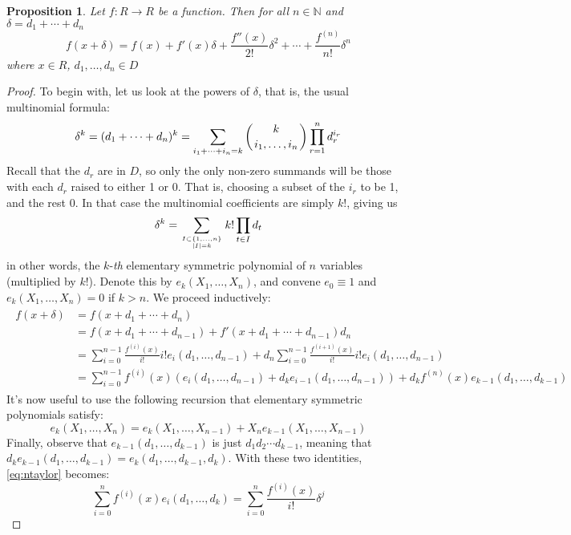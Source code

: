 \documentclass[11pt]{article}
\newtheorem{proposition}{Proposition}[section]
\theoremstyle{definition}
\newcommand{\abs}[1]{\lvert #1 \rvert} %
\numberwithin{equation}{section}
\begin{document}
\begin{proposition}
  Let \( f:R\to R \) be a function. Then for all \( n\in\mathbb N \) and \( \delta = d_1+\cdots+d_n \)
  \begin{equation*}
    f(x+\delta) = f(x) + f'(x)\delta + \frac{f''(x)}{2!}\delta^2 + \cdots + \frac{f^{(n)}}{n!}\delta^n
  \end{equation*}
  where \( x\in R \), \( d_1,\dots,d_n\in D \)
\end{proposition}

\begin{proof}
  To begin with, let us look at the powers of \( \delta \), that is, the usual multinomial formula:
  \begin{equation*}
    \delta^k = (d_1+\cdots+d_n)^k = \sum_{i_1+\cdots+i_n=k}\left( k\atop i_1,\dots,i_n \right)\prod_{r=1}^{n}d_r^{i_r}
  \end{equation*}
  Recall that the \( d_r \) are in \( D \), so only the only non-zero summands will be those with each \( d_r \) raised to either 1 or 0. That is, choosing a subset of the \( i_r \) to be 1, and the rest 0. In that case the multinomial coefficients are simply \( k! \), giving us
  \begin{equation*}
    \delta^k = \sum_{I\subset \{1,\dots,n\}\atop \abs{I}=k}k!\prod_{t\in I}d_t
  \end{equation*}
  in other words, the \( k \)-\textit{th} elementary symmetric polynomial of \( n \) variables (multiplied by \( k! \)). Denote this by \( e_k(X_1,\dots,X_n) \), and convene \( e_0 \equiv 1 \) and \( e_k(X_1,\dots,X_n) = 0 \) if \( k>n \). We proceed inductively:
  \begin{align}
    \begin{split}
      f(x+\delta) & = f(x+d_1+\cdots+d_n) \\[10pt]
                  & = f(x+d_1+\cdots+d_{n-1})+f'(x+d_1+\cdots+d_{n-1})d_n \\[10pt]
		  & = \sum_{i=0}^{n-1}\frac{f^{(i)}(x)}{i!}i!e_i(d_1,\dots,d_{n-1}) + d_n\sum_{i=0}^{n-1}\frac{f^{(i+1)}(x)}{i!}i!e_i(d_1,\dots,d_{n-1}) \\[10pt]
                  & = \sum_{i=0}^{n-1}f^{(i)}(x)\left( e_i(d_1,\dots,d_{n-1})+d_ke_{i-1}(d_1,\dots,d_{n-1})\right) + d_kf^{(n)}(x)e_{k-1}(d_1,\dots,d_{k-1})
    \end{split}
    \label{eq:ntaylor}
  \end{align}
It's now useful to use the following recursion that elementary symmetric polynomials satisfy:
\begin{equation*}
  e_k(X_1,\dots,X_n) = e_{k}(X_1,\dots,X_{n-1}) + X_{n}e_{k-1}(X_1,\dots,X_{n-1})
\end{equation*}
Finally, observe that \( e_{k-1}(d_1,\dots,d_{k-1}) \) is just \( d_1d_2\cdots d_{k-1} \), meaning that \( d_ke_{k-1}(d_1,\dots,d_{k-1}) = e_k(d_1,\dots, d_{k-1},d_k) \). With these two identities, \ref{eq:ntaylor} becomes:
\begin{equation*}
  \sum_{i=0}^{n}f^{(i)}(x)e_i(d_1,\dots,d_k)= \sum_{i=0}^n \frac{f^{(i)}(x)}{i!}\delta^j
\end{equation*}
\end{proof}
\end{document}
